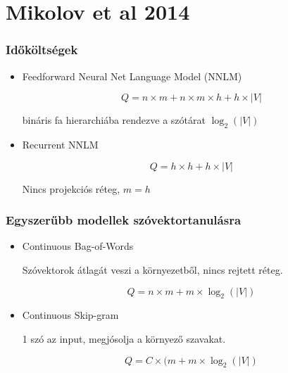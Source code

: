\documentclass{beamer}
\begin{document}
\section{Mikolov et al 2014}
\begin{frame}
\frametitle{Időköltségek}

\begin{itemize}
\item Feedforward Neural Net Language Model (NNLM)

\[ Q = n \times m + n \times m \times h + h \times |V| \]

bináris fa hierarchiába rendezve a szótárat \(\log_2(|V|)\)

\item Recurrent NNLM

\[ Q = h \times h + h \times |V| \]

Nincs projekciós réteg, \(m=h\)
\end{itemize}

\end{frame}

\begin{frame}
\frametitle{Egyszerűbb modellek szóvektortanulásra}

\begin{itemize}
\item Continuous Bag-of-Words

Szóvektorok átlagát veszi a környezetből, nincs rejtett réteg.

\[ Q = n \times m + m \times \log_2(|V|) \]

\item Continuous Skip-gram

1 szó az input, megjósolja a környező szavakat.

\[ Q = C \times (m + m \times \log_2(|V|) \]

\end{itemize}

\end{frame}
\end{document}
